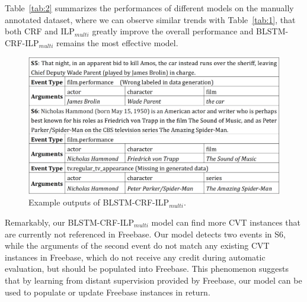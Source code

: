 Table~\ref{tab:2} summarizes the performances of different models on the manually annotated dataset, where we can observe similar trends with Table~\ref{tab:1}, that
both CRF and ILP$_{multi}$ greatly improve the overall performance and
BLSTM-CRF-ILP$_{multi}$ remains the most effective model. %

\begin{figure}[h]
	\centering
	\includegraphics[width=.48\textwidth]{figure3.png}
	\caption{Example outputs of BLSTM-CRF-ILP$_{multi}$.\label{fig:1}}
\end{figure}




Remarkably, our BLSTM-CRF-ILP$_{multi}$ model can find more CVT instances that are currently not referenced in Freebase. Our model detects two events in S6, while the arguments of the second event do not match any existing CVT instances in Freebase, which do not receive any credit during automatic evaluation, but should be populated into Freebase. %
This phenomenon suggests that by learning from distant supervision provided by Freebase, our model can be used to populate or update Freebase instances in return.

